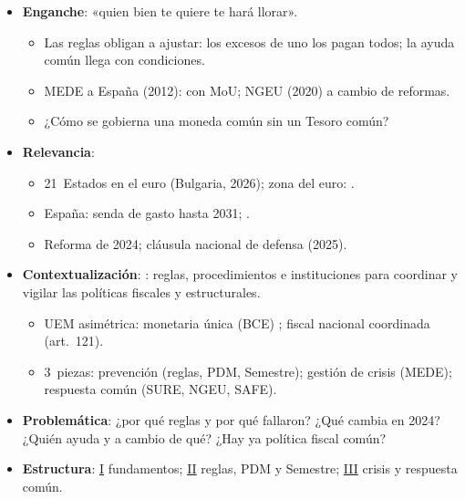 \documentclass{article}
\begin{document}
\cabecerarepaso
\begin{columnas}

\begin{itemize}
\item \textbf{Enganche}: «quien bien te quiere te hará llorar».
  \begin{itemize}
  \item Las reglas obligan a ajustar: los excesos de uno los pagan todos; la ayuda común llega con condiciones.
  \item MEDE a España (2012):  con MoU; NGEU (2020) a cambio de reformas.
  \item ¿Cómo se gobierna una moneda común sin un Tesoro común?
  \end{itemize}
\item \textbf{Relevancia}:
  \begin{itemize}
  \item 21~Estados en el euro (Bulgaria, 2026); zona del euro: .
  \item España: senda de gasto hasta 2031;  .
  \item Reforma de 2024; cláusula nacional de defensa (2025).
  \end{itemize}
\item \textbf{Contextualización}: : reglas, procedimientos e instituciones para coordinar y vigilar las políticas fiscales y estructurales.
  \begin{itemize}
  \item UEM asimétrica: monetaria única (BCE) ; fiscal nacional coordinada (art.~121).
  \item 3~piezas: prevención (reglas, PDM, Semestre); gestión de crisis (MEDE); respuesta común (SURE, NGEU, SAFE).
  \end{itemize}
\item \textbf{Problemática}: ¿por qué reglas y por qué fallaron? ¿Qué cambia en 2024? ¿Quién ayuda y a cambio de qué? ¿Hay ya política fiscal común?
\item \textbf{Estructura}: \hyperref[rep:I]{I} fundamentos; \hyperref[rep:II]{II} reglas, PDM y Semestre; \hyperref[rep:III]{III} crisis y respuesta común.
\end{itemize}


\end{columnas}
\end{document}
